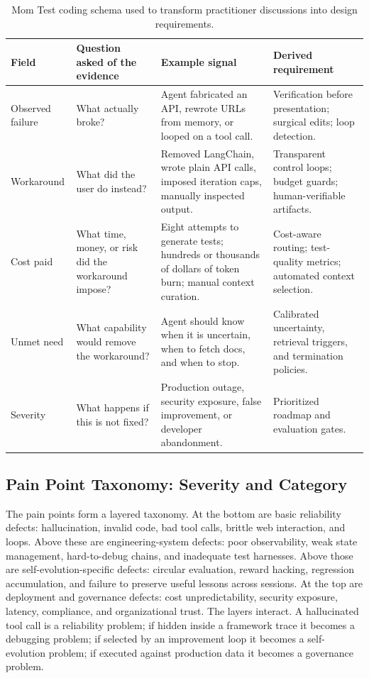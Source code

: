 \begin{table}[t]
\centering
\TableTight
\caption{Mom Test coding schema used to transform practitioner discussions into design requirements.}
\label{tab:mom-test-schema}
\begin{tabularx}{\textwidth}{@{}L{0.16\textwidth}L{0.25\textwidth}L{0.27\textwidth}Y@{}}
\toprule
\textbf{Field} & \textbf{Question asked of the evidence} & \textbf{Example signal} & \textbf{Derived requirement} \\
\midrule
Observed failure & What actually broke? & Agent fabricated an API, rewrote URLs from memory, or looped on a tool call. & Verification before presentation; surgical edits; loop detection. \\
Workaround & What did the user do instead? & Removed LangChain, wrote plain API calls, imposed iteration caps, manually inspected output. & Transparent control loops; budget guards; human-verifiable artifacts. \\
Cost paid & What time, money, or risk did the workaround impose? & Eight attempts to generate tests; hundreds or thousands of dollars of token burn; manual context curation. & Cost-aware routing; test-quality metrics; automated context selection. \\
Unmet need & What capability would remove the workaround? & Agent should know when it is uncertain, when to fetch docs, and when to stop. & Calibrated uncertainty, retrieval triggers, and termination policies. \\
Severity & What happens if this is not fixed? & Production outage, security exposure, false improvement, or developer abandonment. & Prioritized roadmap and evaluation gates. \\
\bottomrule
\end{tabularx}
\end{table}

\subsection{Pain Point Taxonomy: Severity and Category}
\label{subsec:pain-taxonomy}

The pain points form a layered taxonomy. At the bottom are basic reliability defects: hallucination, invalid code, bad tool calls, brittle web interaction, and loops. Above these are engineering-system defects: poor observability, weak state management, hard-to-debug chains, and inadequate test harnesses. Above those are self-evolution-specific defects: circular evaluation, reward hacking, regression accumulation, and failure to preserve useful lessons across sessions. At the top are deployment and governance defects: cost unpredictability, security exposure, latency, compliance, and organizational trust. The layers interact. A hallucinated tool call is a reliability problem; if hidden inside a framework trace it becomes a debugging problem; if selected by an improvement loop it becomes a self-evolution problem; if executed against production data it becomes a governance problem.

